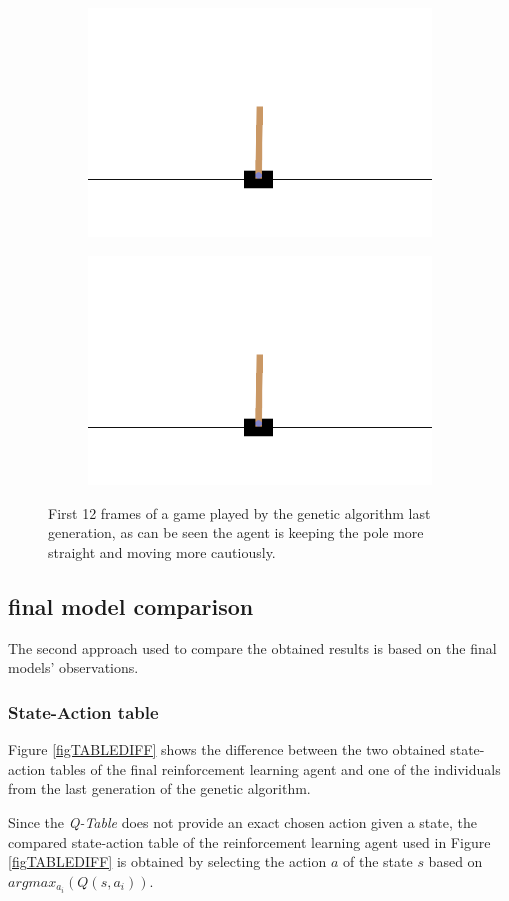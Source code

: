 \begin{figure}[H]
	\hfill
	\begin{subfigure}
		\centering
		\includegraphics[width=0.3\linewidth]{Images/frames/GA/11.png}
	\end{subfigure}
	\hfill
	\begin{subfigure}
		\centering
		\includegraphics[width=0.3\linewidth]{Images/frames/GA/12.png}
	\end{subfigure}
	\caption{First 12 frames of a game played by the genetic algorithm last generation, as can be seen the agent is keeping the pole more straight and moving more cautiously.}
	\label{fig:framesGA}
\end{figure}


\subsection{final model comparison}

The second approach used to compare the obtained results is based on the final models' observations.

\subsubsection{State-Action table}

Figure \ref{figTABLEDIFF} shows the difference between the two obtained state-action tables of the final reinforcement learning agent and one of the individuals from the last generation of the genetic algorithm.

Since the \textit{Q-Table} does not provide an exact chosen action given a state, the compared state-action table of the reinforcement learning agent used in Figure \ref{figTABLEDIFF} is obtained by selecting the action $a$ of the state $s$ based on $argmax_{a_i} (Q(s,a_i))$.

